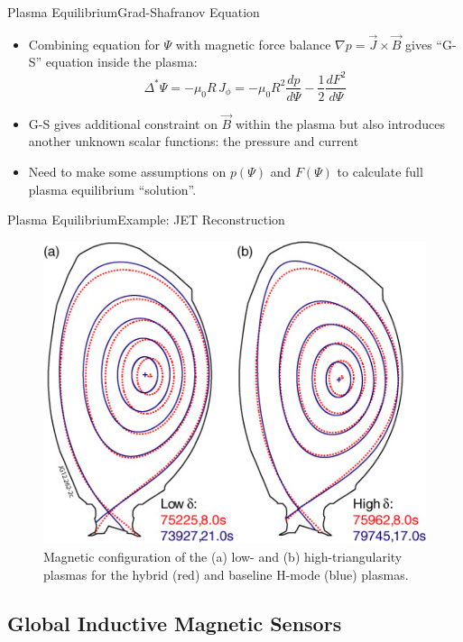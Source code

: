 \documentclass{beamer}
\begin{document}
\begin{frame}{Plasma Equilibrium}{Grad-Shafranov Equation}
  \begin{itemize}
	 \item Combining equation for $\Psi$ with magnetic force balance  $\nabla p = \vec{J} \times \vec{B} $ gives “G-S”  equation inside the plasma: %
		$$ \Delta^* \Psi = -\mu_0 R\, J_\phi=  -\mu_0 R^2  \frac{d p}{d \Psi} -  \frac{1}{2}  \frac{d F^2}{d \Psi}  $$
	\item G-S gives additional constraint on  $ \vec{B}$ within the plasma but also introduces another unknown scalar  functions:  the \alert{ pressure}  and \alert{current}
	\item Need to make some assumptions on $p(\Psi)$  and $F(\Psi)$ to calculate full plasma equilibrium “solution”.
  \end{itemize}

\end{frame}
 
\begin{frame}{Plasma Equilibrium}{Example: JET Reconstruction}
	\begin{figure}[ht]
	\begin{center}
		\includegraphics[width=.55\columnwidth]{JET_magFlux.jpg}
		\caption{\tiny  Magnetic configuration of the (a) low- and (b) high-triangularity plasmas for the hybrid (red) and baseline H-mode (blue) plasmas.}
	\end{center}
	\end{figure}
\end{frame}
 
\subsection{Global Inductive Magnetic Sensors }
\end{document}
